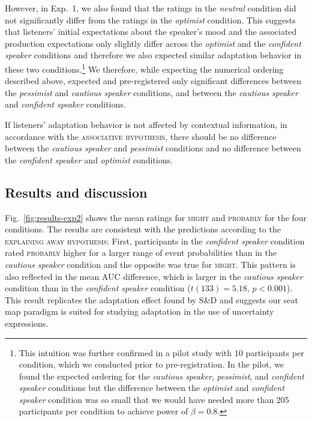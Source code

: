 However, in Exp.~1, we also found that the ratings in the \textit{neutral} condition did not significantly differ from the ratings in the \textit{optimist} condition. This suggests that listeners' initial expectations about the speaker's mood and the associated production expectations only slightly differ across the \textit{optimist} and the \textit{confident speaker} conditions and therefore we also expected similar adaptation behavior in these two conditions.\footnote{This intuition was further confirmed in a pilot study with 10 participants per condition, which we conducted prior to pre-registration. In the pilot, we found the expected ordering for the \textit{cautious speaker}, \textit{pessimist}, and \textit{confident speaker} conditions but the difference between the \textit{optimist} and \textit{confident speaker} condition was so small that we would have needed more than 205 participants per condition to achieve power of $\beta=0.8$.} We therefore, while expecting the numerical ordering described above, expected and pre-registered only significant differences between the \textit{pessimist} and \textit{cautious speaker} conditions, and between the \textit{cautious speaker} and \textit{confident speaker} conditions.

If listeners' adaptation behavior is not affected by contextual information, in accordance with the \textsc{associative hypothesis}, there should be no difference between the \textit{cautious speaker} and  \textit{pessimist} conditions and no difference between the \textit{confident speaker} and \textit{optimist} conditions.

\subsection{Results and discussion}

Fig.~\ref{fig:results-exp2} shows the mean ratings for \textsc{might} and \textsc{probably} for the four conditions. The results are consistent with the predictions according to the \textsc{explaining away hypothesis}: First, participants in the \textit{confident speaker} condition rated \textsc{probably} higher for a larger range of event probabilities than in the \textit{cautious speaker} condition and the opposite was true for \textsc{might}. This pattern is also reflected in the mean AUC difference, which is larger in the \textit{cautious speaker} condition than in the \textit{confident speaker} condition ($t(133)=5.18$, $p < 0.001$). This result replicates the adaptation effect found by S\&D and suggests our seat map paradigm is suited for studying adaptation in the use of uncertainty expressions.

